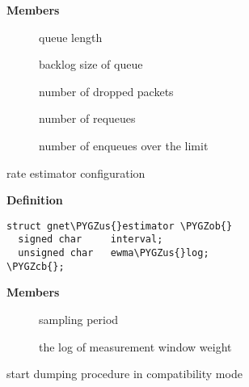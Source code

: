 \documentclass[a4paper,8pt,english]{sphinxmanual}
\def\PYGZus{\char`\_}
\def\PYGZob{\char`\{}
\def\PYGZcb{\char`\}}
\begin{document}
\textbf{Members}
\begin{description}
\item[{}] \leavevmode
queue length

\item[{}] \leavevmode
backlog size of queue

\item[{}] \leavevmode
number of dropped packets

\item[{}] \leavevmode
number of requeues

\item[{}] \leavevmode
number of enqueues over the limit

\end{description}

\begin{fulllineitems}
\label{networking/kapi:c.gnet_estimator}
rate estimator configuration

\end{fulllineitems}


\textbf{Definition}

\begin{Verbatim}[commandchars=\\\{\}]
struct gnet\PYGZus{}estimator \PYGZob{}
  signed char     interval;
  unsigned char   ewma\PYGZus{}log;
\PYGZcb{};
\end{Verbatim}

\textbf{Members}
\begin{description}
\item[{}] \leavevmode
sampling period

\item[{}] \leavevmode
the log of measurement window weight

\end{description}

\begin{fulllineitems}
\label{networking/kapi:c.gnet_stats_start_copy_compat}
start dumping procedure in compatibility mode

\end{fulllineitems}
\end{document}

